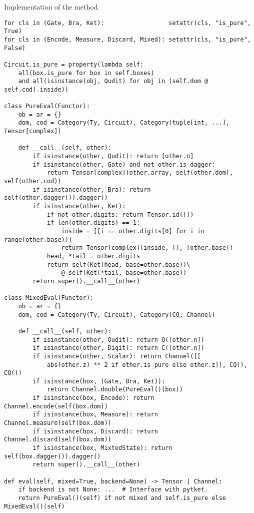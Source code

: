 \begin{python}
{\normalfont Implementation of the  method.}

\begin{verbatim}
for cls in (Gate, Bra, Ket):                  setattr(cls, "is_pure", True)
for cls in (Encode, Measure, Discard, Mixed): setattr(cls, "is_pure", False)

Circuit.is_pure = property(lambda self:
    all(box.is_pure for box in self.boxes)
    and all(isinstance(obj, Qudit) for obj in (self.dom @ self.cod).inside))

class PureEval(Functor):
    ob = ar = {}
    dom, cod = Category(Ty, Circuit), Category(tuple[int, ...], Tensor[complex])

    def __call__(self, other):
        if isinstance(other, Qudit): return [other.n]
        if isinstance(other, Gate) and not other.is_dagger:
            return Tensor[complex](other.array, self(other.dom), self(other.cod))
        if isinstance(other, Bra): return self(other.dagger()).dagger()
        if isinstance(other, Ket):
            if not other.digits: return Tensor.id([])
            if len(other.digits) == 1:
                inside = [[i == other.digits[0] for i in range(other.base)]]
                return Tensor[complex](inside, [], [other.base])
            head, *tail = other.digits
            return self(Ket(head, base=other.base))\
                @ self(Ket(*tail, base=other.base))
        return super().__call__(other)

class MixedEval(Functor):
    ob = ar = {}
    dom, cod = Category(Ty, Circuit), Category(CQ, Channel)

    def __call__(self, other):
        if isinstance(other, Qudit): return Q([other.n])
        if isinstance(other, Digit): return C([other.n])
        if isinstance(other, Scalar): return Channel([[
            abs(other.z) ** 2 if other.is_pure else other.z]], CQ(), CQ())
        if isinstance(box, (Gate, Bra, Ket)):
            return Channel.double(PureEval()(box))
        if isinstance(box, Encode): return Channel.encode(self(box.dom))
        if isinstance(box, Measure): return Channel.measure(self(box.dom))
        if isinstance(box, Discard): return Channel.discard(self(box.dom))
        if isinstance(box, MixtedState): return self(box.dagger()).dagger()
        return super().__call__(other)

def eval(self, mixed=True, backend=None) -> Tensor | Channel:
    if backend is not None: ...  # Interface with pytket.
    return PureEval()(self) if not mixed and self.is_pure else MixedEval()(self)
\end{verbatim}
\end{python}

